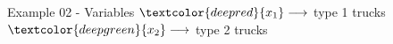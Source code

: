 \begin{frame}{Example 02 - Variables}
\Huge{
$\textcolor{deepred}  {{x}_{1}} \longrightarrow$
    type 1 trucks \\ \vspace{1cm}
$\textcolor{deepgreen}{{x}_{2}} \longrightarrow$
    type 2 trucks
}
\end{frame}
